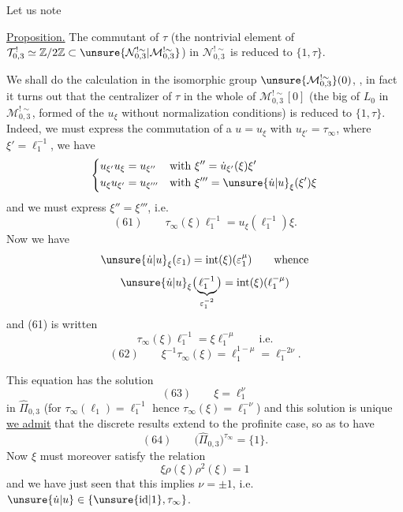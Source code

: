 

Let us note 

\uline{Proposition.} The commutant of $\tau$ (the
nontrivial element of $\mathcal T_{0,3}^{!}\simeq\mathbb Z/2\mathbb Z
\subset\unsure{\mathcal N_{0,3}^{!\sim}|\mathcal M_{0,3}^{!\sim}}$)
in $\mathcal N_{0,3}^{!\sim}$ is reduced to $\{1,\tau\}$.


We shall do the calculation in the isomorphic group
$\unsure{\mathcal M_{0,3}^{!\sim}}(0)$,
,
in fact it turns out that the centralizer of $\tau$ in
the whole of $\mathcal M_{0,3}^{!\sim}[0]$
(the big  of $L_0$ in
$\mathcal M_{0,3}^{!\sim}$, formed of the
$u_{\xi}$ without normalization conditions)
is reduced to $\{1,\tau\}$.
Indeed, we must express the commutation of a
$u=u_{\xi}$ with
$u_{\xi'}=\tau_\infty$,
where $\xi'=\ell_1^{-1}$, we have
\[
\left\{\begin{aligned}
u_{\xi'}u_{\xi}
&=u_{\xi''}
&&\text{with }\xi''=
\dot u_{\xi'}(\xi)\xi'
\\
u_{\xi}u_{\xi'}
&=u_{\xi'''}
&&\text{with }\xi'''=
\unsure{\dot u|u}_{\xi}(\xi')\xi
\end{aligned}\right.
\]
and we must express $\xi''=\xi'''$, i.e.
\[
(61)\qquad
\tau_\infty(\xi)\ell_1^{-1}
=u_{\xi}(\ell_1^{-1})\xi.
\]
Now we have
\[
\unsure{\dot u|u}_{\xi}(\varepsilon_1)
=\mathrm{int}(\xi)(\varepsilon_1^\mu)
\qquad\text{whence}
\]
\[
\unsure{\dot u|u}_{\xi}
\bigl(\underbrace{\ell_1^{-1}}_{\varepsilon_1^{-2}}\bigr)
=\mathrm{int}(\xi)(\ell_1^{-\mu})
\]
and (61) is written
\[
\tau_\infty(\xi)\ell_1^{-1}
=\xi\ell_1^{-\mu}\qquad\text{i.e.}
\]
\[
(62)\qquad
\xi^{-1}\tau_\infty(\xi)
=\ell_1^{1-\mu}=\ell_1^{-2\nu}.
\]


This equation has the solution
\[
(63)\qquad\xi=\ell_1^\nu
\]
in $\widehat\Pi_{0,3}$ (for $\tau_\infty(\ell_1)=\ell_1^{-1}$
hence $\tau_\infty(\xi)=\ell_1^{-\nu}$)
and this solution is unique \uline{ we admit}
that the discrete results extend to the profinite case,
so as to have
\[
(64)\qquad\bigl(\widehat\Pi_{0,3}\bigr)^{\tau_\infty}=\{1\}.
\]
Now $\xi$ must moreover satisfy the relation
\[
\xi\rho(\xi)
\rho^2(\xi)=1
\]
and we have just seen that this implies
$\nu=\pm1$, i.e.
$\unsure{\dot u|u}\in\{\unsure{\mathrm{id}|1},\tau_\infty\}$.

